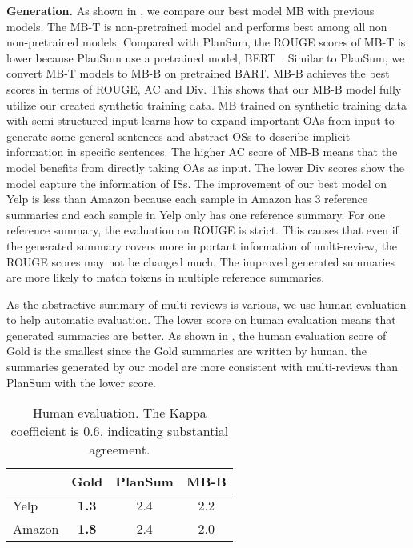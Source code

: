 \textbf{Generation.}
As shown in , we compare our best model MB with previous models.
The MB-T is non-pretrained model and performs best among all non non-pretrained models.
Compared with PlanSum, the ROUGE scores of MB-T is lower
because PlanSum use a pretrained model, BERT~\cite{BERT19}.
Similar to PlanSum, we convert MB-T models to MB-B on pretrained BART.
MB-B achieves the best scores in terms of ROUGE, AC and Div.
This shows that our MB-B model 
fully utilize our created synthetic training data.
MB trained on synthetic training data with semi-structured input
learns how to expand important OAs from input to generate some general
sentences and abstract OSs to describe implicit information 
in specific sentences.
The higher AC score of MB-B means
that the model benefits from directly taking OAs as input.
The lower Div scores show the model capture the information of
ISs.
The improvement of our best model on Yelp is less than Amazon
because each sample in Amazon has 3 reference summaries and each sample in Yelp only has one reference summary.
For one reference summary,
the evaluation on ROUGE is strict.
This causes that even if the generated summary covers
more important information of multi-review, 
the ROUGE scores may not be changed much.
The improved generated summaries are more likely to match tokens
in multiple reference summaries. 


As the abstractive summary of multi-reviews is various,
we use human evaluation
to help automatic evaluation.
The lower score on human evaluation means that generated summaries are better.
As shown in  , 
the human evaluation score of Gold is the smallest
since the Gold summaries are written by human.
the summaries generated by our model 
are more consistent with multi-reviews than PlanSum with the lower score.


\begin{table}[th]
	\centering
	\small
	\begin{tabular}{|l|c|c|c|}
		\hline 
		& Gold & PlanSum & MB-B\\
		\hline
	   Yelp & \bf{1.3} &  2.4 & 2.2\\
	   Amazon &\bf{1.8} & 2.4 & 2.0 \\
	   \hline
	\end{tabular}
	\caption{Human evaluation. 
	The Kappa coefficient is $0.6$, indicating substantial agreement.
	}\label{tab:human}  
\end{table}

